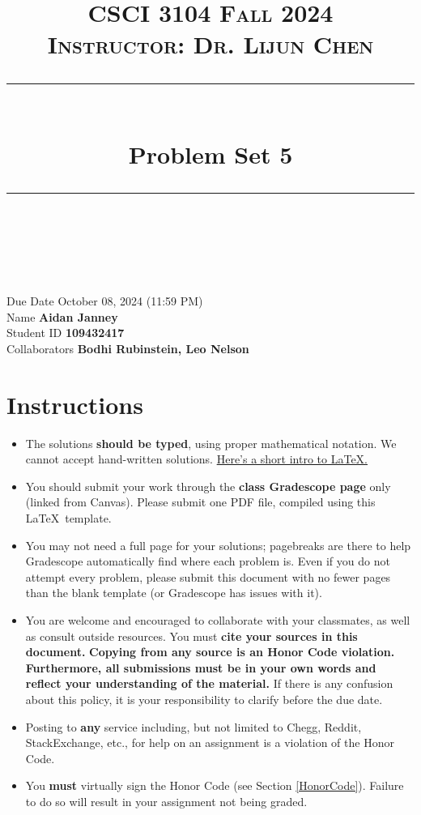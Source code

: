 \documentclass[11pt]{article}
\title{
\normalfont \normalsize 
\textsc{CSCI 3104 Fall 2024 \\ 
Instructor: Dr. Lijun Chen} \\
[10pt] 
\rule{\linewidth}{0.5pt} \\[6pt] 
\huge Problem Set 5 \\
\rule{\linewidth}{2pt}  \\[10pt]
}
\date{}
\theoremstyle{definition}
\theoremstyle{definition}
\theoremstyle{definition}
\begin{document}
\maketitle


\noindent
Due Date \dotfill October 08, 2024 (11:59 PM) \\
Name \dotfill \textbf{Aidan Janney} \\
Student ID \dotfill \textbf{109432417} \\
Collaborators \dotfill \textbf{Bodhi Rubinstein, Leo Nelson}

\section*{Instructions}
 \begin{itemize}
	\item The solutions \textbf{should be typed}, using proper mathematical notation. We cannot accept hand-written solutions. \href{http://ece.uprm.edu/~caceros/latex/introduction.pdf}{Here's a short intro to \LaTeX.}
	\item You should submit your work through the \textbf{class Gradescope page} only (linked from Canvas). Please submit one PDF file, compiled using this \LaTeX \ template.
	\item You may not need a full page for your solutions; pagebreaks are there to help Gradescope automatically find where each problem is. Even if you do not attempt every problem, please submit this document with no fewer pages than the blank template (or Gradescope has issues with it).

	\item You are welcome and encouraged to collaborate with your classmates, as well as consult outside resources. You must \textbf{cite your sources in this document.} \textbf{Copying from any source is an Honor Code violation. Furthermore, all submissions must be in your own words and reflect your understanding of the material.} If there is any confusion about this policy, it is your responsibility to clarify before the due date. 

	\item Posting to \textbf{any} service including, but not limited to Chegg, Reddit, StackExchange, etc., for help on an assignment is a violation of the Honor Code.

	\item You \textbf{must} virtually sign the Honor Code (see Section \ref{HonorCode}). Failure to do so will result in your assignment not being graded.
\end{itemize}
\end{document}
